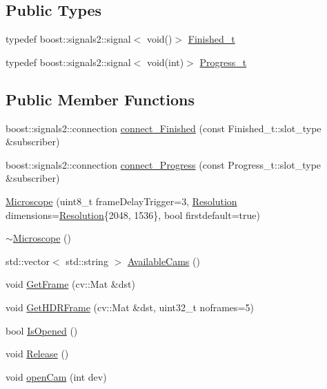 \subsection*{Public Types}
\begin{DoxyCompactItemize}
\item 
typedef boost\+::signals2\+::signal$<$ void()$>$ \hyperlink{class_hardware_1_1_microscope_a062b6c7876e05cc311a54bd85da459b2}{Finished\+\_\+t}
\item 
typedef boost\+::signals2\+::signal$<$ void(int)$>$ \hyperlink{class_hardware_1_1_microscope_a5288928044551054276042c402c5a6a1}{Progress\+\_\+t}
\end{DoxyCompactItemize}
\subsection*{Public Member Functions}
\begin{DoxyCompactItemize}
\item 
boost\+::signals2\+::connection \hyperlink{class_hardware_1_1_microscope_abc3f008ec7cf00e6ddf31b0a4ed392cb}{connect\+\_\+\+Finished} (const Finished\+\_\+t\+::slot\+\_\+type \&subscriber)
\item 
boost\+::signals2\+::connection \hyperlink{class_hardware_1_1_microscope_abc29f83a2f0ba536df3eb7ccc250b111}{connect\+\_\+\+Progress} (const Progress\+\_\+t\+::slot\+\_\+type \&subscriber)
\item 
\hyperlink{class_hardware_1_1_microscope_a335599c313acd6f5e2f94c09a3475620}{Microscope} (uint8\+\_\+t frame\+Delay\+Trigger=3, \hyperlink{struct_hardware_1_1_microscope_1_1_resolution}{Resolution} dimensions=\hyperlink{struct_hardware_1_1_microscope_1_1_resolution}{Resolution}\{2048, 1536\}, bool firstdefault=true)
\item 
\hyperlink{class_hardware_1_1_microscope_afb6b20021157077feaf8df0e465a1f0e}{$\sim$\+Microscope} ()
\item 
std\+::vector$<$ std\+::string $>$ \hyperlink{class_hardware_1_1_microscope_a48c34d1597a9d90f61427cbd2a25bdb9}{Available\+Cams} ()
\item 
void \hyperlink{class_hardware_1_1_microscope_a1ec5c792320ae4db3f3b39830e74f880}{Get\+Frame} (cv\+::\+Mat \&dst)
\item 
void \hyperlink{class_hardware_1_1_microscope_a8cec2eacbd3f0ea164d16100a6078d5b}{Get\+H\+D\+R\+Frame} (cv\+::\+Mat \&dst, uint32\+\_\+t noframes=5)
\item 
bool \hyperlink{class_hardware_1_1_microscope_ae799dbdff39787d3226e8e8ce25386de}{Is\+Opened} ()
\item 
void \hyperlink{class_hardware_1_1_microscope_a87119548948d7af1e3c38af2e2afa482}{Release} ()
\item 
void \hyperlink{class_hardware_1_1_microscope_abc753dfc72956ef7285d0e373fb7e1f1}{open\+Cam} (int dev)
\end{DoxyCompactItemize}
